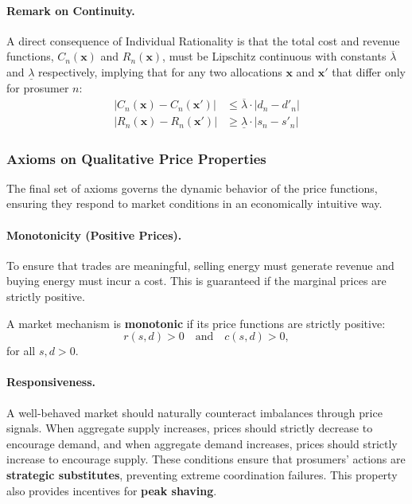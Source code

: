 \documentclass[12pt, notitlepage]{article}
\begin{document}
\paragraph{Remark on Continuity.}
A direct consequence of Individual Rationality is that the total cost and revenue functions, $C_n(\bm{x})$ and $R_n(\bm{x})$, must be Lipschitz continuous with constants $\overline{\lambda}$ and $\underline{\lambda}$ respectively, implying that for any two allocations $\bm{x}$ and $\bm{x}'$ that differ only for prosumer $n$:
\begin{align*}
    |C_n(\bm{x}) - C_n(\bm{x}')| &\le \overline{\lambda} \cdot |d_n - d'_n| \\
    |R_n(\bm{x}) - R_n(\bm{x}')| &\ge \underline{\lambda} \cdot |s_n - s'_n|
\end{align*}


\subsubsection{Axioms on Qualitative Price Properties}
The final set of axioms governs the dynamic behavior of the price functions, ensuring they respond to market conditions in an economically intuitive way.

\paragraph{Monotonicity (Positive Prices).}
To ensure that trades are meaningful, selling energy must generate revenue and buying energy must incur a cost. This is guaranteed if the marginal prices are strictly positive.

\begin{axiom}[Monotonicity]
A market mechanism is \textbf{monotonic} if its price functions are strictly positive:
\begin{equation}
    r(s,d) > 0 \quad \text{and} \quad c(s,d) > 0,
\end{equation}
for all $s,d > 0$.
\end{axiom}

\paragraph{Responsiveness.}
A well-behaved market should naturally counteract imbalances through price signals. When aggregate supply increases, prices should strictly decrease to encourage demand, and when aggregate demand increases, prices should strictly increase to encourage supply. These conditions ensure that prosumers' actions are \textbf{strategic substitutes}, preventing extreme coordination failures. This property also provides incentives for \textbf{peak shaving}.
\end{document}
